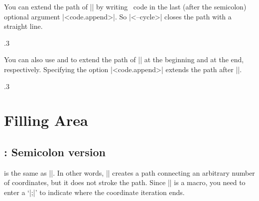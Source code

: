 You can extend the path of |\tzlinks| by writing \Tikz\ code in the last (after the semicolon) optional argument |<code.append>|.
So |<--cycle>| closes the path with a straight line.

\begin{tzcode}{.3}
\end{tzcode}

You can also use \icmd{\tzlinksAtBegin} and \icmd{\tzlinksAtEnd} to extend the path of |\tzlinks| at the beginning and at the end, respectively.
Specifying the option |<code.append>| extends the path after |\tzlinksAtEnd|.

\begin{tzcode}{.3}
\end{tzcode}




\chapter{Filling Area}
\label{c:fillingarea}

\section{\protect\cmd{\tzpath}: Semicolon version}
\label{s:tzpath}


\icmd{\tzpath} is the same as |\tzlinks[draw=none]|. In other words, |\tzpath| creates a path connecting an arbitrary number of coordinates, but it does not stroke the path. Since |\tzpath| is a  macro, you need to enter a  `|;|' to indicate where the coordinate iteration ends.

